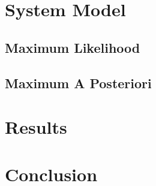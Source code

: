 \documentclass[12pt,a4paper]{report}
\begin{document}
\section{System Model}


\subsection{Maximum Likelihood}
\subsection{Maximum A Posteriori}


\section{Results}

\section{Conclusion}

\newpage

\end{document}
